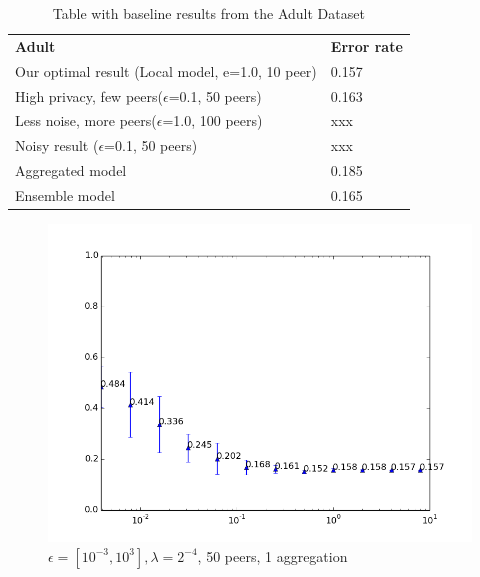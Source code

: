 \begin{table}[h]
	\begin{tabular}{ll}
		\textbf{Adult} & \textbf{Error rate} \\
		Our optimal result (Local model, e=1.0, 10 peer)                  & 0.157 \\
		High privacy, few peers($\epsilon$=0.1, 50 peers)				  & 0.163  \\
		Less noise, more peers($\epsilon$=1.0, 100 peers)				  & xxx  \\
		Noisy result ($\epsilon$=0.1, 50 peers)                           & xxx  \\
		Aggregated model												  & 0.185 \\
		Ensemble model													  &	0.165
	\end{tabular}
	\caption{Table with baseline results from the Adult Dataset}
	\label{tab:baseline_class_results_adult}
\end{table}

\begin{figure}[H]
	\centering
	\includegraphics[width=\textwidth]{fig/spambase/eps2e-8-2e8,budg=eps,peers10,groups10,reg2e-2-data368-pubAll-spam-baseline-testset}
	\caption{$\epsilon = [10^{-3}, 10^{3}], \lambda = 2^{-4}$, 50 peers, 1 aggregation}
	\label{fig:epsilon_big_range}
\end{figure}

